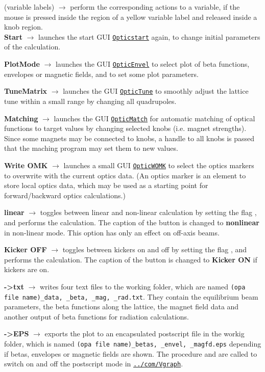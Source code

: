 \documentclass[12pt]{article}
\newcommand\code[1]{{\tt #1}}
\newcommand{\ofld}[1]{\colorbox{black!15}{{\bf #1}}}
\newcommand{\ofldx}[1]{\colorbox{black!15}{(#1)}}
\newcommand\guico[1]{{\color{blue}\code{#1}}}
\newcommand\guifco[1]{{\color{violet}\code{#1}}}
\newcommand{\unico}[1]{{\color{burntorange}\code{#1}}}
\newcommand{\evcod}[2]{\ofld{#1} $\rightarrow$ \guico{#2}}
\newcommand{\evcodx}[2]{\ofldx{#1} $\rightarrow$ \guico{#2}}
\newcommand{\opagui}[1]{\colorbox{blue!20}{\code{#1}}}
\newcommand{\ogui}[1]{\hyperref[#1]{\opagui{#1}}}
\newcommand{\opaguif}[1]{\colorbox{violet!30}{\code{#1}}}
\newcommand{\oguif}[1]{\hyperref[#1]{\opaguif{#1}}}
\begin{document}
{\evcodx{variable labels}{varbutMouseDown, varbutMouseUp} perform the corresponding actions to a variable, if the mouse is pressed inside the region of a yellow variable label and released inside a knob region.\\

\evcod{Start}{butStarClick} launches the start GUI \ogui{Opticstart} again, to change initial parameters of the calculation.

\evcod{PlotMode}{butenvlClick} launches the GUI \ogui{OpticEnvel} to select plot of beta functions, envelopes or magnetic fields, and to set some plot parameters.

\evcod{TuneMatrix}{buttuneClick} launches the GUI \ogui{OpticTune} to smoothly adjust the lattice tune within a small range by changing all quadrupoles.

\evcod{Matching}{butmatClick} launches the GUI \ogui{OpticMatch} for automatic matching of optical functions to target values by changing selected knobs (i.e. magnet strengths). Since some magnets may be connected to knobs, a handle to all knobs is passed that the maching program may set them to new values.

\evcod{Write OMK}{butwomkClick} launches a small GUI \ogui{OpticWOMK} to select the optics markers to overwrite with the current optics data. (An optics marker is an element to store local optics data, which may be used as a starting point for forward/backward optics calculations.)

\evcod{linear}{butnlinClick} toggles between linear and non-linear calculation by setting the flag \unico{UseSext}, and performs the calculation. The caption of the button is changed to \ofld{nonlinear} in non-linear mode. This option has only an effect on off-axis beams.

\evcod{Kicker OFF}{butkickClick} toggles between kickers on and off by setting the flag \unico{UsePulsed}, and performs the calculation. The caption of the button is changed to \ofld{Kicker ON} if kickers are on.

\evcod{-\textgreater txt}{butdataClick} writes four text files to the working folder, which are named \code{(opa file name)\_data, \_beta, \_mag, \_rad.txt}. They contain the equilibrium beam parameters, the beta functions along the lattice, the magnet field data and another output of beta functions for radiation calculations. 

\evcod{-\textgreater EPS}{butepsClick} exports the plot to an encapsulated postscript file in the workig folder, which is named \code{(opa file name)\_betas, \_envel, \_magfd.eps} depending if betas, envelopes or magnetic fields are shown. 
The procedure \guifco{PS\_start} and \guifco{PS\_stop} are called to switch on and off the postscript mode in \oguif{../com/Vgraph}.

}
\end{document}
